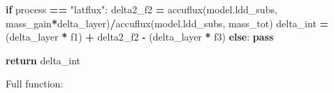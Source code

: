 \documentclass[]{article}
\newenvironment{Shaded}{\begin{snugshade}}{\end{snugshade}}
\newcommand{\StringTok}[1]{\textcolor[rgb]{0.31,0.60,0.02}{{#1}}}
\newcommand{\ControlFlowTok}[1]{\textcolor[rgb]{0.13,0.29,0.53}{\textbf{{#1}}}}
\newcommand{\OperatorTok}[1]{\textcolor[rgb]{0.81,0.36,0.00}{\textbf{{#1}}}}
\newcommand{\NormalTok}[1]{{#1}}
\begin{document}
\begin{Shaded}
\begin{Highlighting}[]
    \ControlFlowTok{if} \NormalTok{process }\OperatorTok{==} \StringTok{"latflux"}\NormalTok{:}
        \NormalTok{delta2_f2 }\OperatorTok{=} \NormalTok{accuflux(model.ldd_subs, mass_gain}\OperatorTok{*}\NormalTok{delta_layer)}\OperatorTok{/}\NormalTok{accuflux(model.ldd_subs, mass_tot)}
        \NormalTok{delta_int }\OperatorTok{=} \NormalTok{(delta_layer }\OperatorTok{*} \NormalTok{f1) }\OperatorTok{+} \NormalTok{delta2_f2 }\OperatorTok{-} \NormalTok{(delta_layer }\OperatorTok{*} \NormalTok{f3)}
    \ControlFlowTok{else}\NormalTok{:}
        \ControlFlowTok{pass}
        
    \ControlFlowTok{return} \NormalTok{delta_int}
                       
\end{Highlighting}
\end{Shaded}

Full function:
\end{document}
